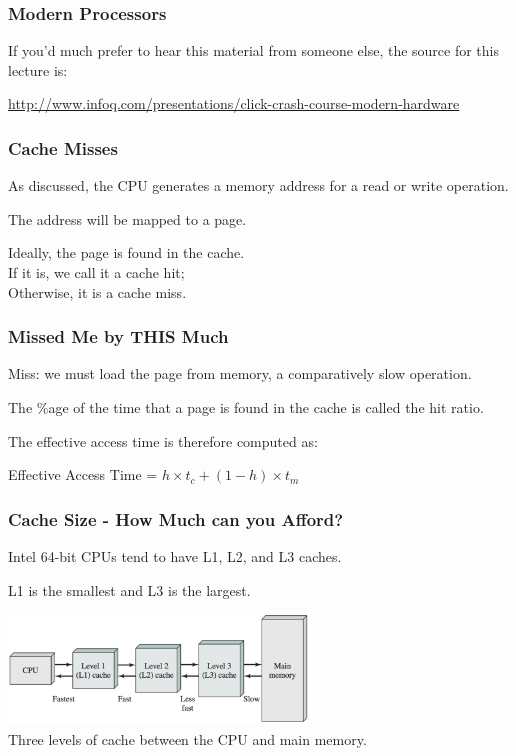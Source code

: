\begin{frame}
\frametitle{Modern Processors}

If you'd much prefer to hear this material from someone else, the source for this lecture is:

\begin{center}
\url{http://www.infoq.com/presentations/click-crash-course-modern-hardware}
\end{center}

\end{frame}

\begin{frame}
\frametitle{Cache Misses}

As discussed, the CPU generates a memory address for a read or write operation.

The address will be mapped to a page. 

Ideally, the page is found in the cache.\\
\quad If it is, we call it a \alert{cache hit};\\
\quad Otherwise, it is a \alert{cache miss}.

\end{frame}



\begin{frame}
\frametitle{Missed Me by THIS Much}

Miss: we must load the page from memory, a comparatively slow operation.


The \%age of the time that a page is found in the cache is called the \alert{hit ratio}.

 The effective access time is therefore computed as:

\begin{center}
Effective Access Time = $h \times t_{c} + (1-h) \times t_{m}$
\end{center}

\end{frame}



\begin{frame}
\frametitle{Cache Size - How Much can you Afford?}

Intel 64-bit CPUs tend to have L1, L2, and L3 caches. 

L1 is the smallest and L3 is the largest.

\begin{center}
\includegraphics[width=0.6\textwidth]{images/caches.png}\\
Three levels of cache between the CPU and main memory.
\end{center}


\end{frame}



